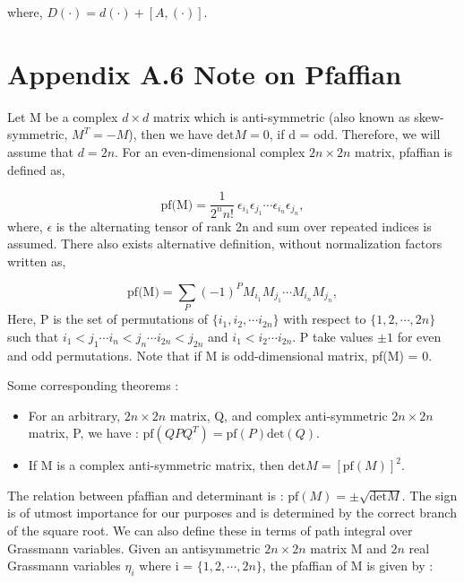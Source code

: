 where, $D (\cdot) = d (\cdot) + [A, (\cdot)]$. 


\section*{\label{app:pfaffian1} Appendix A.6 Note on Pfaffian}

Let M be a complex $d \times d$ matrix which is anti-symmetric (also known as skew-symmetric, $M^{T} = -M$), then we have $\text{det}M = 0$, if d = odd. Therefore, we will assume that $d = 2n$. 
For an even-dimensional complex $ 2n \times 2n$ matrix, pfaffian is defined as, 

\begin{equation}
\text{pf(M)} = \frac{1}{2^n n!} ~ \epsilon_{i_{1}}\epsilon_{j_{1}} \cdots \epsilon_{i_{n}}\epsilon_{j_{n}}, 
\end{equation}
where, $\epsilon$ is the alternating tensor of rank 2n and sum over repeated indices is assumed. There also exists alternative definition, without normalization factors written as, 

\begin{equation}
\text{pf(M)} = \sum_{P} (-1)^{P}  M_{i_{1}}M_{j_{1}} \cdots M_{i_{n}}M_{j_{n}}, 
\end{equation}
Here, P is the set of permutations of $\{i_{1}, i_{2}, \cdots i_{2n}\}$ with respect to  $\{1, 2, \cdots, 2n\}$ such 
that $ i_{1} < j_{1} \cdots i_{n} < j_{n} \cdots i_{2n} < j_{2n} $ and $ i_{1} < i_{2} \cdots i_{2n}$. P take values 
$\pm 1$ for even and odd permutations. Note that if M is odd-dimensional matrix, pf(M) = 0. 

Some corresponding theorems :

\begin{itemize}
\item For an arbitrary, $ 2n \times 2n$ matrix, Q, and complex anti-symmetric $ 2n \times 2n$ matrix, P, we have : $\text{pf}(QPQ^{T}) = \text{pf}(P) \text{det}(Q)$. 
\item If M is a complex anti-symmetric matrix, then $\text{det} M = [\text{pf}(M)]^{2}$.
\end{itemize}

The relation between pfaffian and determinant is : $\text{pf}(M) = \pm \sqrt{\text{det}M}$. The sign is of utmost importance for our purposes and is 
determined by the correct branch of the square root. 
We can also define these in terms of path integral over Grassmann variables. Given an antisymmetric $ 2n \times 2n$ matrix M and $2n$ real 
Grassmann variables $\eta_{i}$ where i = $\{1, 2, \cdots, 2n\}$, the pfaffian of M is given by :


